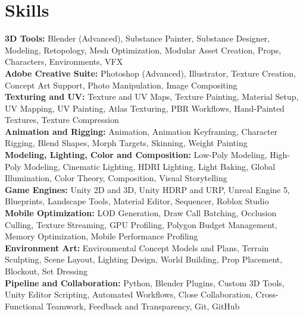 \documentclass[letterpaper,11pt]{article}
\begin{document}
\section{Skills}
 \begin{itemize}[leftmargin=0.15in, label={}]
    \small{\item{
     \textbf{3D Tools:}{ Blender (Advanced), Substance Painter, Substance Designer, Modeling, Retopology, Mesh Optimization, Modular Asset Creation, Props, Characters, Environments, VFX} \\
     \textbf{Adobe Creative Suite:}{ Photoshop (Advanced), Illustrator, Texture Creation, Concept Art Support, Photo Manipulation, Image Compositing} \\
     \textbf{Texturing and UV:}{ Texture and UV Maps, Texture Painting, Material Setup, UV Mapping, UV Painting, Atlas Texturing, PBR Workflows, Hand-Painted Textures, Texture Compression} \\
     \textbf{Animation and Rigging:}{ Animation, Animation Keyframing, Character Rigging, Blend Shapes, Morph Targets, Skinning, Weight Painting} \\
     \textbf{Modeling, Lighting, Color and Composition:}{ Low-Poly Modeling, High-Poly Modeling, Cinematic Lighting, HDRI Lighting, Light Baking, Global Illumination, Color Theory, Composition, Visual Storytelling} \\
     \textbf{Game Engines:}{ Unity 2D and 3D, Unity HDRP and URP, Unreal Engine 5, Blueprints, Landscape Tools, Material Editor, Sequencer, Roblox Studio} \\
     \textbf{Mobile Optimization:}{ LOD Generation, Draw Call Batching, Occlusion Culling, Texture Streaming, GPU Profiling, Polygon Budget Management, Memory Optimization, Mobile Performance Profiling} \\
     \textbf{Environment Art:}{ Environmental Concept Models and Plans, Terrain Sculpting, Scene Layout, Lighting Design, World Building, Prop Placement, Blockout, Set Dressing} \\
     \textbf{Pipeline and Collaboration:}{ Python, Blender Plugins, Custom 3D Tools, Unity Editor Scripting, Automated Workflows, Close Collaboration, Cross-Functional Teamwork, Feedback and Transparency, Git, GitHub}
    }}
 \end{itemize}

\end{document}

